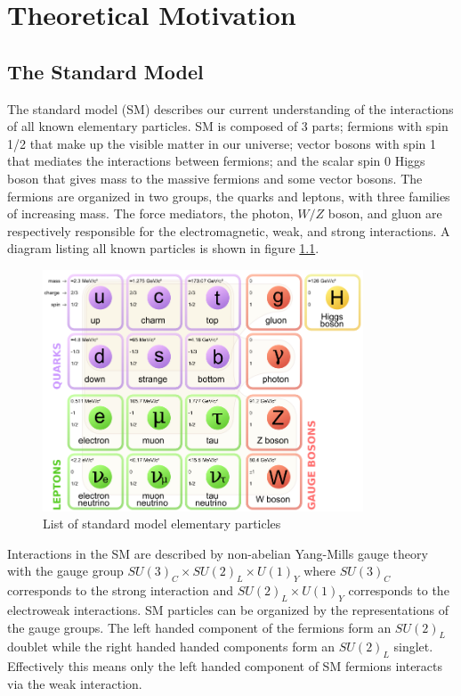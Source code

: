 
\chapter{Theoretical Motivation}
\label{chap:motivation}
\section{The Standard Model}

\indent  The standard model (SM) describes our current understanding of the interactions of all known elementary particles.  SM is composed of 3 parts; fermions with spin 1/2 that make up the visible matter in our universe; vector bosons with spin 1 that mediates the interactions between fermions; and the scalar spin 0 Higgs boson that gives mass to the massive fermions and some vector bosons.  The fermions are organized in two groups, the quarks and leptons, with three families of increasing mass.  The force mediators, the photon, $W/Z$ boson, and gluon are respectively responsible for the electromagnetic, weak, and strong interactions.  A diagram listing all known particles is shown in figure \ref{fig:SM:part}. \\

\begin{figure}[htbp]
	\begin{center}
		\includegraphics[width=0.85\textwidth]{figures/theory/Standard_Model_of_Elementary_Particles.png}
		\caption{List of standard model elementary particles}
		\label{fig:SM:part}
	\end{center}
\end{figure}

\indent  Interactions in the SM are described by non-abelian Yang-Mills gauge theory with the gauge group $SU(3)_C \times SU(2)_L \times U(1)_Y$ where $SU(3)_C$ corresponds to the strong interaction and $SU(2)_L \times U(1)_Y$ corresponds to the electroweak interactions. SM particles can be  organized by the representations of the gauge groups.  The left handed component of the fermions form an $SU(2)_L$ doublet while the right handed handed components form an $SU(2)_L$ singlet.  Effectively this means only the left handed component of SM fermions interacts via the weak interaction.  \\

